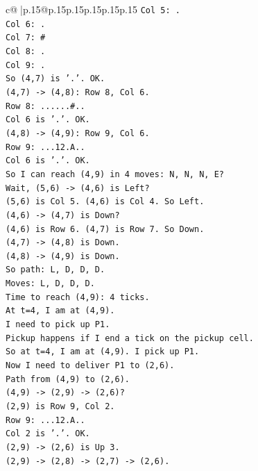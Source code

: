 \documentclass{article}
\begin{document}
{\begin{supertabular}{c@{$\;$}|p{.15\linewidth}@{}p{.15\linewidth}p{.15\linewidth}p{.15\linewidth}p{.15\linewidth}p{.15\linewidth}}
{{{\texttt{Col 5: .} \\
\texttt{Col 6: .} \\
\texttt{Col 7: \#} \\
\texttt{Col 8: .} \\
\texttt{Col 9: .} \\
\texttt{So (4,7) is '.'. OK.} \\
\texttt{(4,7) {-}> (4,8): Row 8, Col 6.} \\
\texttt{Row 8: ......\#..} \\
\texttt{Col 6 is '.'. OK.} \\
\texttt{(4,8) {-}> (4,9): Row 9, Col 6.} \\
\texttt{Row 9: ...12.A..} \\
\texttt{Col 6 is '.'. OK.} \\
\texttt{So I can reach (4,9) in 4 moves: N, N, N, E?} \\
\texttt{Wait, (5,6) {-}> (4,6) is Left?} \\
\texttt{(5,6) is Col 5. (4,6) is Col 4. So Left.} \\
\texttt{(4,6) {-}> (4,7) is Down?} \\
\texttt{(4,6) is Row 6. (4,7) is Row 7. So Down.} \\
\texttt{(4,7) {-}> (4,8) is Down.} \\
\texttt{(4,8) {-}> (4,9) is Down.} \\
\texttt{So path: L, D, D, D.} \\
\texttt{Moves: L, D, D, D.} \\
\texttt{Time to reach (4,9): 4 ticks.} \\
\texttt{At t=4, I am at (4,9).} \\
\texttt{I need to pick up P1.} \\
\texttt{Pickup happens if I end a tick on the pickup cell.} \\
\texttt{So at t=4, I am at (4,9). I pick up P1.} \\
\texttt{Now I need to deliver P1 to (2,6).} \\
\texttt{Path from (4,9) to (2,6).} \\
\texttt{(4,9) {-}> (2,9) {-}> (2,6)?} \\
\texttt{(2,9) is Row 9, Col 2.} \\
\texttt{Row 9: ...12.A..} \\
\texttt{Col 2 is '.'. OK.} \\
\texttt{(2,9) {-}> (2,6) is Up 3.} \\
\texttt{(2,9) {-}> (2,8) {-}> (2,7) {-}> (2,6).} \\
}}}
\end{supertabular}}
\end{document}
